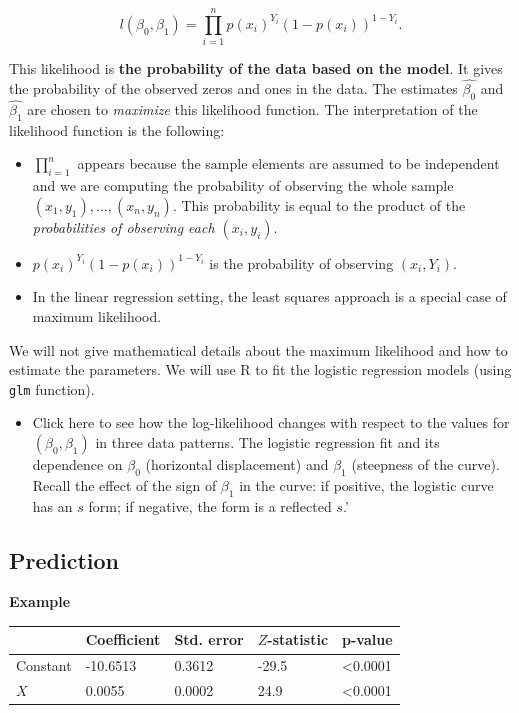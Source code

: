 \documentclass[]{book}
\providecommand{\tightlist}{%
  \setlength{\itemsep}{0pt}\setlength{\parskip}{0pt}}
\newenvironment{rmdblock}[1]
  {\begin{shaded*}
  \begin{itemize}
  \renewcommand{\labelitemi}{
    \raisebox{-.7\height}[0pt][0pt]{
      {\setkeys{Gin}{width=2em,keepaspectratio}\texttt{[image: img/icons/\#1]}}
    }
  }
  \item
  }
  {
  \end{itemize}
  \end{shaded*}
  }
\newenvironment{rmdinsight}
  {\begin{rmdblock}{insight}}
  {\end{rmdblock}}
\begin{document}
\[ l(\beta_0,\beta_1) = \prod_{i=1}^n p(x_i)^{Y_i}(1-p(x_i))^{1-Y_i}. \]

This likelihood is \textbf{the probability of the data based on the
model}. It gives the probability of the observed zeros and ones in the
data. The estimates \(\hat{\beta_0}\) and \(\hat{\beta_1}\) are chosen
to \emph{maximize} this likelihood function. The interpretation of the
likelihood function is the following:

\begin{itemize}
\tightlist
\item
  \(\prod_{i=1}^n\) appears because the sample elements are assumed to
  be independent and we are computing the probability of observing the
  whole sample \((x_{1},y_1),\ldots,(x_{n},y_n)\). This probability is
  equal to the product of the \emph{probabilities of observing each
  \((x_{i},y_i)\)}.
\item
  \(p(x_i)^{Y_i}(1-p(x_i))^{1-Y_i}\) is the probability of observing
  \((x_{i},Y_i)\).
\end{itemize}

\begin{rmdinsight}
In the linear regression setting, the least squares approach is a
special case of maximum likelihood.
\end{rmdinsight}

We will not give mathematical details about the maximum likelihood and
how to estimate the parameters. We will use R to fit the logistic
regression models (using \texttt{glm} function).

\begin{rmdinsight}
Click here to see how the log-likelihood changes with respect to the
values for \((\beta_0,\beta_1)\) in three data patterns. The logistic
regression fit and its dependence on \(\beta_0\) (horizontal
displacement) and \(\beta_1\) (steepness of the curve). Recall the
effect of the sign of \(\beta_1\) in the curve: if positive, the
logistic curve has an \(s\) form; if negative, the form is a reflected
\(s\).'
\end{rmdinsight}

\subsection{Prediction}\label{prediction-1}

\textbf{Example}

\begin{longtable}[]{@{}lllll@{}}
\toprule
& Coefficient & Std. error & \(Z\)-statistic & p-value\tabularnewline
\midrule
\endhead
Constant & -10.6513 & 0.3612 & -29.5 & \textless{}0.0001\tabularnewline
\(X\) & 0.0055 & 0.0002 & 24.9 & \textless{}0.0001\tabularnewline
\bottomrule
\end{longtable}
\end{document}
